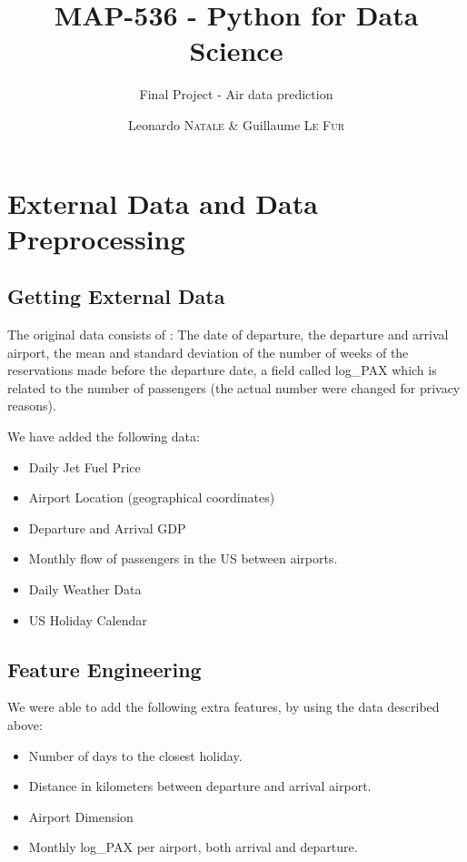 \documentclass[a4paper,12pt,twoside]{article}
\title{MAP-536 - Python for Data Science}
\subtitle{Final Project - Air data prediction}
\author{Leonardo \textsc{Natale} \& Guillaume \textsc{Le Fur}}
\begin{document}
\maketitle

\section{External Data and Data Preprocessing}

\subsection{Getting External Data}
The original data consists of : The date of departure, the departure and arrival airport, the mean and standard deviation of the number of weeks of the reservations made before the departure date, a field called log\_PAX which is related to the number of passengers (the actual number were changed for privacy reasons).

We have added the following data:
\begin{itemize}
	\item Daily Jet Fuel Price
	\item Airport Location (geographical coordinates)
	\item Departure and Arrival GDP
	\item Monthly flow of passengers in the US between airports.
	\item Daily Weather Data
	\item US Holiday Calendar
\end{itemize}

\subsection{Feature Engineering}

We were able to add the following extra features, by using the data described above:
\begin{itemize}
	\item Number of days to the closest holiday.
	\item Distance in kilometers between departure and arrival airport.
	\item Airport Dimension
	\item Monthly log\_PAX per airport, both arrival and departure.
\end{itemize}
\end{document}
